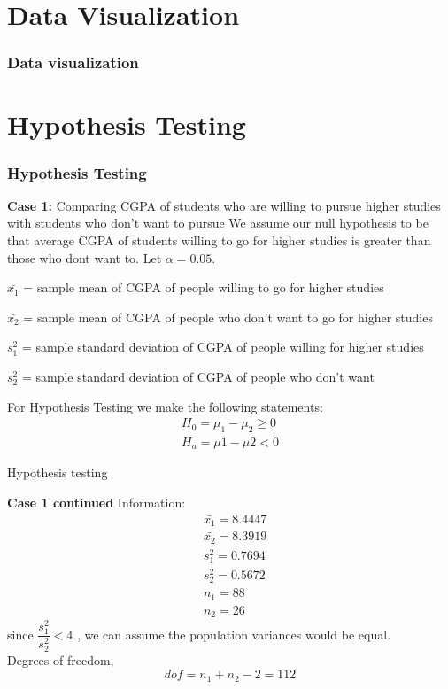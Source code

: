 \documentclass{beamer}
\begin{document}
\section{Data Visualization}
\begin{frame}
  \frametitle{Data visualization}
  
\end{frame}

\section{Hypothesis Testing}
\begin{frame}
  \frametitle{Hypothesis Testing}
  \begin{block}{\textbf{Case 1:}{ Comparing CGPA of students who are willing to pursue higher studies with students who don't want to pursue  }}
     We assume our null hypothesis to be that average CGPA of students willing to go for higher studies is  greater than those who dont want to. Let $\alpha = 0.05$.
     \begin{enumerate*}
         \item  $\bar{x_1}$ = sample mean of CGPA of people willing to go for higher studies\\
         \item  $\bar{x_2}$ = sample mean of CGPA of people who  don't want to go for higher studies\\
         \item  $s^2_1$ = sample standard deviation of CGPA of people willing for higher studies\\
         \item  $s^2_2$ = sample standard deviation of CGPA of people who  don't want \\
     \end{enumerate*}
   For Hypothesis Testing we make the following statements:
      \begin{align*}
          H_0=\mu_1-\mu_2\geq0\\
          H_a=\mu1-\mu2<0
      \end{align*}
        \end{block}
    \end{frame}
    \begin{frame}{Hypothesis testing}
        \begin{block}{\textbf{Case 1 continued}}
            Information:
             \begin{align}
                 &\bar{x_1}=8.4447\\
                 &\bar{x_2}=8.3919\\
                 &s^2_1=0.7694\\
                 &s^2_2=0.5672\\
                 &n_1=88\\
                 &n_2=26
             \end{align}
       since $\dfrac{s^2_1}{s^2_2}<4$ , we can assume the population variances would be equal. \\
       Degrees of freedom, $$dof=n_1+n_2-2=112$$
        \end{block}
    \end{frame}
\end{document}
